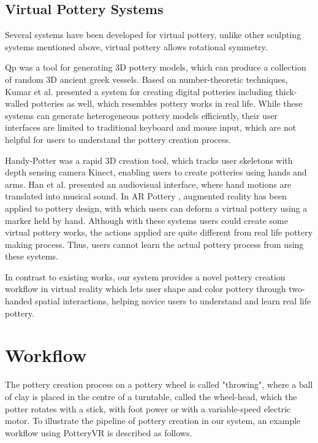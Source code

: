 \subsection{Virtual Pottery Systems}
\label{sec:2.3}


Several systems have been developed for virtual pottery, unlike other sculpting systems mentioned above, virtual pottery allows rotational symmetry.

Qp \cite{koutsoudis2009qp} was a tool for generating 3D pottery models, which can produce a collection of random 3D ancient greek vessels.
Based on number-theoretic techniques, Kumar et al. \cite{kumar2011wheel} presented a system for creating digital potteries including thick-walled potteries as well, which resembles pottery works in real life.
While these systems can generate heterogeneous pottery models efficiently, their user interfaces are limited to traditional keyboard and mouse input, which are not helpful for users to understand the pottery creation process.

Handy-Potter \cite{murugappan2013handy} was a rapid 3D creation tool, which tracks user skeletons with depth sensing camera Kinect, enabling users to create potteries using hands and arms.
Han et al. \cite{han2014virtual} presented an audiovisual interface, where hand motions are translated into musical sound.
In AR Pottery \cite{han2007ar}, augmented reality has been applied to pottery design, with which users can deform a virtual pottery using a marker held by hand.
Although with these systems users could create some virtual pottery works, the actions applied are quite different from real life pottery making process. Thus, users cannot learn the actual pottery process from using these systems.

In contrast to existing works, our system provides a novel pottery creation workflow in virtual reality which lets user shape and color pottery through two-handed spatial interactions, helping novice users to understand and learn real life pottery.



\section{Workflow}
\label{sec:3}

The pottery creation process on a pottery wheel is called "throwing", where a ball of clay is placed in the centre of a turntable, called the wheel-head, which the potter rotates with a stick, with foot power or with a variable-speed electric motor.
To illustrate the pipeline of pottery creation in our system, an example workflow using PotteryVR is described as follows.


